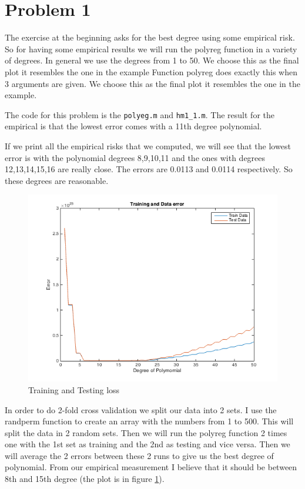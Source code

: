 \section{Problem 1}

The exercise at the beginning asks for the best degree using some empirical risk. So for having some empirical results we will run the polyreg function in a variety of degrees. In general we use the degrees from 1 to 50. We choose this as the final plot it resembles the one in the example Function polyreg does exactly this when 3 arguments are given. We choose this as the final plot it resembles the one in the example.

The code for this problem is the \texttt{polyeg.m} and \texttt{hm1\_1.m}. The result for the empirical is that the lowest error comes with a 11th degree polynomial.

If we print all the empirical risks that we computed, we will see
that the lowest error is with the polynomial degrees 8,9,10,11
and the ones with degrees 12,13,14,15,16 are really close.
The errors are 0.0113 and 0.0114 respectively. So these degrees are reasonable.
\begin{figure}[!h]
{
    \includegraphics[width=\columnwidth]
    {figures/new.png}
    \caption{\footnotesize{\bf}Training and Testing loss}
    \label{fig:fold}
}
\end{figure}

In order to do 2-fold cross validation we split our data into 2 sets.
I use the randperm function to create an array with the numbers from
1 to 500. This will split the data in 2 random sets. Then we will 
run the polyreg function 2 times one with the 1st set as training and
the 2nd as testing and vice versa. Then we will average the 2 errors
between these 2 runs to give us the best degree of polynomial. From
our empirical measurement I believe that it should be between 8th and
15th degree (the plot is in figure \ref{fig:fold}).

